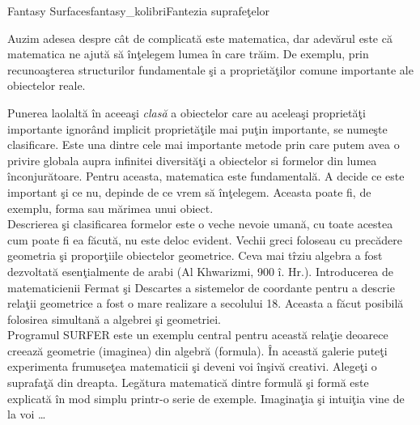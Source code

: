 
\begin{surferIntroPage}{Fantasy Surfaces}{fantasy_kolibri}{Fantezia suprafe\c telor}
 
Auzim adesea despre c\^at de complicat\u a este matematica, dar adev\u arul este c\u a matematica ne ajut\u a
s\u a \^in\c telegem lumea \^in care tr\u aim. 
De exemplu, prin recunoa\c sterea structurilor fundamentale \c si a propriet\u a\c tilor comune importante ale
obiectelor reale.

Punerea laolalt\u a \^in aceea\c si \textit{clas\u a} a obiectelor care au acelea\c si propriet\u a\c ti importante
ignor\^and implicit propriet\u a\c tile mai pu\c tin importante, se nume\c ste clasificare.
Este una dintre cele mai importante metode prin care putem avea o privire globala aupra infinitei diversit\u a\c ti
a obiectelor si formelor din lumea \^inconjur\u atoare. Pentru aceasta, matematica este fundamental\u a.
A decide ce este important \c si ce nu, depinde de ce vrem s\u a \^in\c telegem. Aceasta poate fi, de exemplu, forma
sau m\u arimea unui obiect.
\\

\vspace{0.4cm}
Descrierea \c si clasificarea formelor este o veche nevoie uman\u a, cu toate acestea cum poate fi ea f\u acut\u a,
nu este deloc evident. Vechii greci foloseau cu prec\u adere geometria \c si propor\c tiile obiectelor geometrice.
Ceva mai t\^rziu algebra a fost dezvoltat\u a esen\c tialmente de arabi (Al Khwarizmi, 900 \^i. Hr.).
Introducerea de matematicienii Fermat \c si Descartes a sistemelor de coordante pentru a 
descrie rela\c tii geometrice a fost o mare realizare a secolului 18. Aceasta a f\u acut posibil\u a folosirea 
simultan\u a a algebrei \c si geometriei.
\\

\vspace{0.4cm}
Programul SURFER este un exemplu central pentru aceast\u a rela\c tie deoarece creeaz\u a geometrie (imaginea)
din algebr\u a (formula).
\^In aceast\u a galerie pute\c ti experimenta frumuse\c tea matematicii \c si deveni voi \^in\c siv\u a creativi.
Alege\c ti o suprafa\c t\u a din dreapta. Leg\u atura matematic\u a dintre formul\u a \c si form\u a este 
explicat\u a \^in mod simplu printr-o serie de exemple.
Imagina\c tia \c si intui\c tia vine de la voi  \dots

\end{surferIntroPage}